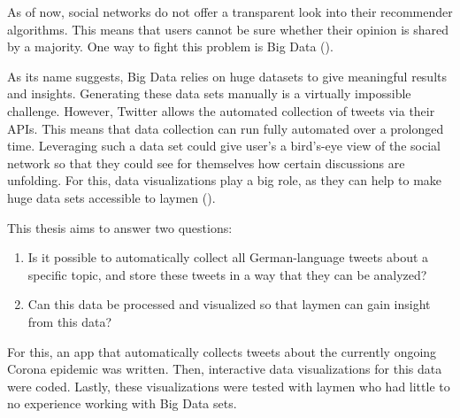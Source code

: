 As of now, social networks do not offer a transparent look into their recommender algorithms. This means that users cannot be sure whether their opinion is shared by a majority. One way to fight this problem is Big Data (\cite{crawfordCriticalQuestionsBig2012}).

As its name suggests, Big Data relies on huge datasets to give meaningful results and insights. Generating these data sets manually is a virtually impossible challenge. However, Twitter allows the automated collection of tweets via their APIs. This means that data collection can run fully automated over a prolonged time. Leveraging such a data set could give user's a bird's-eye view of the social network so that they could see for themselves how certain discussions are unfolding. For this, data visualizations play a big role, as they can help to make huge data sets accessible to laymen (\cite{donalekImmersiveCollaborativeData2014}).

This thesis aims to answer two questions:

\begin{enumerate}
    \item Is it possible to automatically collect all German-language tweets about a specific topic, and store these tweets in a way that they can be analyzed?
    \item Can this data be processed and visualized so that laymen can gain insight from this data?
\end{enumerate}

For this, an app that automatically collects tweets about the currently ongoing Corona epidemic was written. Then, interactive data visualizations for this data were coded. Lastly, these visualizations were tested with laymen who had little to no experience working with Big Data sets.
